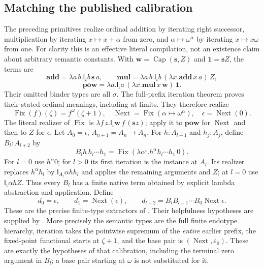 \documentclass[11pt,a4paper]{article}
\newcommand{\It}{\mathsf I}
\begin{document}
\subsection{Matching the published calibration}
The preceding primitives realize ordinal addition by iterating right successor,
multiplication by iterating $x\mapsto x+\alpha$ from zero, and
$\alpha\mapsto\omega^\alpha$ by iterating $x\mapsto x\omega$ from one.
For clarity this is an effective literal compilation, not an existence
claim about arbitrary semantic constants. With $\mathbf w=
\operatorname{Cap}(\mathbf s,Z)$ and $\mathbf1=\mathbf sZ$, the terms are
\[
 \mathbf{add}=\lambda a\,b.\It_\iota b\,\mathbf s\,a,\qquad
 \mathbf{mul}=\lambda a\,b.\It_\iota b\,
                    (\lambda x.\mathbf{add}\,x\,a)\,Z,
\]
\[
 \mathbf{pow}=\lambda a.\It_\iota a\,
                 (\lambda x.\mathbf{mul}\,x\,\mathbf w)\,\mathbf1.
\]
Their omitted binder types are all $\sigma$. The full-prefix iteration
theorem proves their stated ordinal meanings, including at limits.
They therefore realize
\[
 \operatorname{Fix}(f)(\zeta)=f^\omega(\zeta+1),\quad
 \operatorname{Next}=\operatorname{Fix}(\alpha\mapsto\omega^\alpha),
 \quad\epsilon=\operatorname{Next}(0).
\]
The literal realizer of $\operatorname{Fix}$ is
$\lambda f\,z.\It_\iota\mathbf w\,f\,(\mathbf s z)$;
apply it to $\mathbf{pow}$ for $\operatorname{Next}$ and then to $Z$
for $\epsilon$.
Let $A_0=\iota$, $A_{n+1}=A_n\to A_n$. For
$h:A_{l+1}$ and $h_j:A_j$, define $B_l:A_{l+2}$ by
\[
 B_lh\,h_l\cdots h_1
 =\operatorname{Fix}(\lambda\alpha^{\iota}.
                 h^\alpha h_l\cdots h_1\,0).
\]
For $l=0$ use $h^\alpha0$; for $l>0$ its first iteration is the instance
at $A_l$. Its realizer replaces $h^\alpha h_l$ by
$\It_{A_l}\alpha h h_l$ and applies the remaining arguments and $Z$;
at $l=0$ use $\It_\iota\alpha h Z$. Thus every $B_l$ has a finite native
term obtained by explicit lambda abstraction and application.
Define
\[
 d_0=\epsilon,\qquad d_1=\operatorname{Next}(\epsilon),\qquad
 d_{l+2}=B_lB_{l-1}\cdots B_0\operatorname{Next}\epsilon.
\]
These are the precise finite-type extractors of
\cite[Definitions 2.4--2.5, 2.10, 2.12, 2.14; Theorem 6.1 and Corollary 6.2]{simmons}.
Their helpfulness hypotheses are supplied by
\cite[Definition 5.1 and Theorem 5.10]{simmonshelpful}.
More precisely the semantic types are the full finite endotype hierarchy,
iteration takes the pointwise supremum of the \emph{entire} earlier prefix,
the fixed-point functional starts at $\zeta+1$, and the base pair is
$(\operatorname{Next},\varepsilon_0)$. These are exactly the hypotheses of
that calibration, including the terminal zero argument in $B_l$; a base
pair starting at $\omega$ is not substituted for it.
\end{document}
